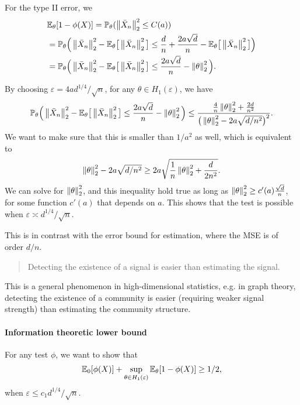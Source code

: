 \documentclass[11pt,letterpaper]{article}
\numberwithin{theorem}{lecture}
\numberwithin{proposition}{lecture}
\numberwithin{lemma}{lecture}
\numberwithin{claim}{lecture}
\numberwithin{corollary}{lecture}
\numberwithin{definition}{lecture}
\numberwithin{conjecture}{lecture}
\numberwithin{remark}{lecture}
\numberwithin{example}{lecture}
\numberwithin{equation}{lecture}
\begin{document}
For the type II error, we
\begin{align*}
  &{\mathbb{E}}_\theta [1 - \phi (X)] = {\mathbb{P}}_\theta (\left\| \bar{X}_n\right\|_{2}^2 \leq C (a))\\
  &= {\mathbb{P}}_\theta \Big(\left\| \bar{X}_n\right\|_{2}^2 - {\mathbb{E}}_\theta \big[ \left\| \bar{X}_n\right\|_{2}^2 \big] \leq \frac{d}{n} + \frac{2 a \sqrt{d}}{n} -  {\mathbb{E}}_\theta \big[ \left\| \bar{X}_n\right\|_{2}^2 \big] \Big)\\
  & = {\mathbb{P}}_\theta \Big(\left\| \bar{X}_n\right\|_{2}^2 - {\mathbb{E}}_\theta \big[ \left\| \bar{X}_n\right\|_{2}^2 \big] \leq \frac{2 a \sqrt{d}}{n} -  \left\| \theta\right\|_{2}^2\Big).
\end{align*}

By choosing $\varepsilon = 4 ad^{1/4} / \sqrt{n}$, for any $\theta \in H_1 (\varepsilon)$, we have
\begin{align*}
  {\mathbb{P}}_\theta \Big(\left\| \bar{X}_n\right\|_{2}^2 - {\mathbb{E}}_\theta \big[ \left\| \bar{X}_n\right\|_{2}^2 \big] \leq \frac{2 a \sqrt{d}}{n} -  \left\| \theta\right\|_{2}^2\Big) \leq \frac{\frac{4}{n} \left\| \theta\right\|_{2}^2 + \frac{2d}{n^2}}{\big( \left\| \theta\right\|_{2}^2 - 2 a \sqrt{d/n^2} \big)^2}.
\end{align*}
We want to make sure that this is smaller than $1/a^2$ as well, which is equivalent to
\begin{align*}
  \left\| \theta\right\|_{2}^2 - 2 a \sqrt{d/n^2} \geq 2 a \sqrt{\frac{1}{n} \left\| \theta\right\|_{2}^2 + \frac{d}{2 n^2}}.
\end{align*}
We can solve for $\left\| \theta\right\|_{2}^2$, and this inequality hold true as long as $\left\| \theta\right\|_{2}^2 \geq c' (a) \frac{\sqrt{d}}{n}$, for some function $c' (a)$ that depends on $a$. This shows that the test is possible when $\varepsilon \asymp d^{1/4} / \sqrt{n}$.

This is in contrast with the error bound for estimation, where the MSE is of order $d/n$.
\begin{quote}
  Detecting the existence of a signal is easier than estimating the signal.
\end{quote}
This is a general phenomenon in high-dimensional statistics, e.g. in graph theory, detecting the existence of a community is easier (requiring weaker signal strength) than estimating the community structure.

\paragraph{Information theoretic lower bound} For any test $\phi$, we want to show that
\begin{align*}
  {\mathbb{E}}_0 [\phi (X)] + \sup_{\theta \in H_1 (\varepsilon)} {\mathbb{E}}_\theta [1 - \phi (X)] \geq 1/2,
\end{align*}
when $\varepsilon \leq c_1 d^{1/4} / \sqrt{n}$.
\end{document}
